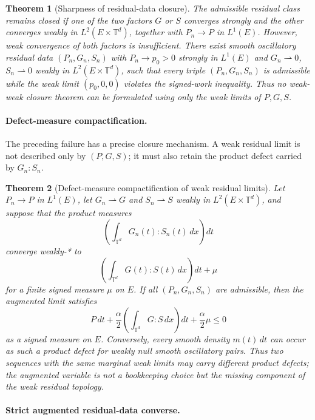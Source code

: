 \documentclass[11pt]{article}
\numberwithin{equation}{section}
\newtheorem{maintheorem}{Theorem}
\begin{document}
\begin{maintheorem}[Sharpness of residual-data closure]
\label{thm:intro-weak-sharpness}
The admissible residual class remains closed if one of the two factors
\(G\) or \(S\) converges strongly and the other converges weakly in
\(L^2(E\times\mathbb T^d)\), together with \(P_n\to P\) in \(L^1(E)\).
However, weak convergence of both factors is insufficient.  There exist smooth
oscillatory residual data \((P_n,G_n,S_n)\) with \(P_n\to p_0>0\) strongly in
\(L^1(E)\) and \(G_n\rightharpoonup0\), \(S_n\rightharpoonup0\) weakly in
\(L^2(E\times\mathbb T^d)\), such that every triple \((P_n,G_n,S_n)\) is
admissible while the weak limit \((p_0,0,0)\) violates the signed-work
inequality.  Thus no weak-weak closure theorem can be formulated using only
the weak limits of \(P,G,S\).
\end{maintheorem}

\paragraph{Defect-measure compactification.}

The preceding failure has a precise closure mechanism.  A weak residual limit is
not described only by \((P,G,S)\); it must also retain the product defect carried
by \(G_n:S_n\).

\begin{maintheorem}[Defect-measure compactification of weak residual limits]
\label{thm:intro-defect-compactification}
Let \(P_n\to P\) in \(L^1(E)\), let \(G_n\rightharpoonup G\) and
\(S_n\rightharpoonup S\) weakly in \(L^2(E\times\mathbb T^d)\), and suppose that
the product measures
\[
  \left(\int_{\mathbb T^d}G_n(t):S_n(t)\,dx\right)dt
\]
converge weakly-* to
\[
  \left(\int_{\mathbb T^d}G(t):S(t)\,dx\right)dt+\mu
\]
for a finite signed measure \(\mu\) on \(E\).  If all
\((P_n,G_n,S_n)\) are admissible, then the augmented limit satisfies
\[
  P\,dt+\frac{\alpha}{2}
  \left(\int_{\mathbb T^d}G:S\,dx\right)dt
  +\frac{\alpha}{2}\mu\le0
\]
as a signed measure on \(E\).  Conversely, every smooth density \(m(t)\,dt\)
can occur as such a product defect for weakly null smooth oscillatory pairs.
Thus two sequences with the same marginal weak limits may carry different
product defects; the augmented variable is not a bookkeeping choice but the
missing component of the weak residual topology.
\end{maintheorem}

\paragraph{Strict augmented residual-data converse.}
\end{document}
